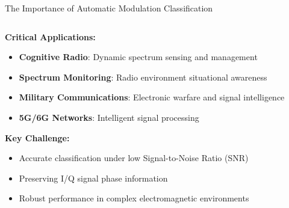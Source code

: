 \documentclass[aspectratio=169]{beamer}
\begin{document}
\begin{frame}{The Importance of Automatic Modulation Classification}
\begin{columns}
\begin{column}{0.6\textwidth}
\textbf{Critical Applications:}
\begin{itemize}
\item \textbf{Cognitive Radio}: Dynamic spectrum sensing and management
\item \textbf{Spectrum Monitoring}: Radio environment situational awareness
\item \textbf{Military Communications}: Electronic warfare and signal intelligence
\item \textbf{5G/6G Networks}: Intelligent signal processing
\end{itemize}

\vspace{0.5cm}
\textbf{Key Challenge:}
\begin{itemize}
\item Accurate classification under low Signal-to-Noise Ratio (SNR)
\item Preserving I/Q signal phase information
\item Robust performance in complex electromagnetic environments
\end{itemize}
\end{column}
\begin{column}{0.4\textwidth}
\end{column}
\end{columns}
\end{frame}
\end{document}

